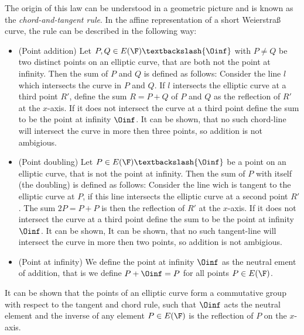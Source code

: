 The origin of this law can be understood in a geometric picture and is known as the \textit{chord-and-tangent rule}. In the affine representation of a short Weierstraß curve, the rule can be described in the following way:
\begin{itemize}
\item (Point addition) Let $P, Q\in E(\F)\textbackslash \{\Oinf\}$ with $P\neq Q$ be two distinct points on an elliptic curve, that are both not the point at infinity. Then the sum of $P$ and $Q$ is defined as follows: Consider the line $l$ which intersects the curve in $P$ and $Q$. If $l$ intersects the elliptic curve at a third point $R'$, define the sum $R=P+Q$ of $P$ and $Q$ as the reflection of $R'$ at the $x$-axis. If it does not intersect the curve at a third point define the sum to be the point at infinity $\Oinf$. It can be shown, that no such chord-line will intersect the curve in more then three points, so addition is not ambigious.
\item (Point doubling) Let $P \in E(\F)\textbackslash \{\Oinf\}$ be a point on an elliptic curve, that is not the point at infinity. Then the sum of $P$ with itself (the doubling) is defined as follows: Consider the line wich is tangent to the elliptic curve at $P$, if this line intersects the elliptic curve at a second point $R'$. The sum $2P=P+P$ is then the reflection of $R'$ at the $x$-axis. If it does not intersect the curve at a third point define the sum to be the point at infinity $\Oinf$. It can be shown, It can be shown, that no such tangent-line will intersect the curve in more then two points, so addition is not ambigious.
\item (Point at infinity) We define the point at infinity $\Oinf$ as the neutral ement of addition, that is we define $P+\Oinf = P$ for all points $P\in E(\F)$.
\end{itemize}
It can be shown that the points of an elliptic curve form a commutative group with respect to the tangent and chord rule, such that $\Oinf$ acts the neutral element and the inverse of any element $P\in E(\F)$ is the reflection of $P$ on the $x$-axis.

